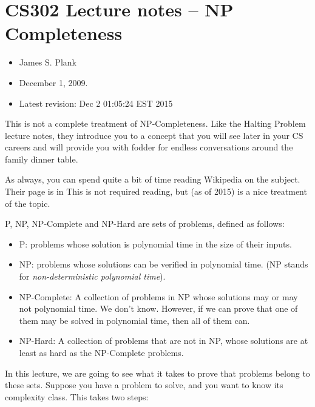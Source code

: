 \documentclass[12pt]{article}
\begin{document}
\section{CS302 Lecture notes -- NP Completeness}\begin{itemize}
\item  James S. Plank

\item  December 1, 2009.

\item  Latest revision: Dec  2 01:05:24 EST 2015

\end{itemize}
This is not a complete treatment of NP-Completeness.  Like the Halting Problem
lecture notes, they introduce you to a concept that you will see later in 
your CS careers and will provide you with fodder for endless conversations
around the family dinner table.

As always, you can spend quite a bit of time reading Wikipedia on the 
subject.  Their page is
in This is not required reading, but (as of 2015) is a nice treatment of the topic.


P, NP, NP-Complete and NP-Hard are sets of problems, defined as follows:


\begin{itemize}
\item  \textmd{P}: problems whose solution is polynomial time in the size of their inputs.

\item  \textmd{NP}: problems whose solutions can be verified in polynomial time.
(NP stands for \textit{non-deterministic polynomial time}).

\item  \textmd{NP-Complete}: A collection of problems in NP whose solutions may or may not
polynomial time.  We don't know.  However, if we can prove that one of them may be solved
in polynomial time, then all of them can.

\item  \textmd{NP-Hard}: A collection of problems that are not in NP, whose solutions are at least as hard
as the NP-Complete problems.  

\end{itemize}


In this lecture, we are going to see what it takes to prove that problems belong
to these sets.  
Suppose you have a problem to solve, and you want to know its complexity class.
This takes two steps:
\end{document}
